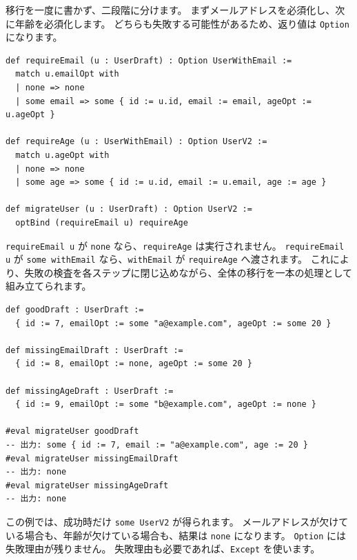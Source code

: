 移行を一度に書かず、二段階に分けます。
まずメールアドレスを必須化し、次に年齢を必須化します。
どちらも失敗する可能性があるため、返り値は \texttt{Option} になります。

\begin{listing}[htbp]
\begin{verbatim}
def requireEmail (u : UserDraft) : Option UserWithEmail :=
  match u.emailOpt with
  | none => none
  | some email => some { id := u.id, email := email, ageOpt := u.ageOpt }

def requireAge (u : UserWithEmail) : Option UserV2 :=
  match u.ageOpt with
  | none => none
  | some age => some { id := u.id, email := u.email, age := age }

def migrateUser (u : UserDraft) : Option UserV2 :=
  optBind (requireEmail u) requireAge
\end{verbatim}
\caption{\texttt{migrateUser}}
\label{lst:ch17_user_migration}
\end{listing}

\texttt{requireEmail u} が \texttt{none} なら、\texttt{requireAge} は実行されません。
\texttt{requireEmail u} が \texttt{some withEmail} なら、\texttt{withEmail} が \texttt{requireAge} へ渡されます。
これにより、失敗の検査を各ステップに閉じ込めながら、全体の移行を一本の処理として組み立てられます。

\begin{listing}[htbp]
\begin{verbatim}
def goodDraft : UserDraft :=
  { id := 7, emailOpt := some "a@example.com", ageOpt := some 20 }

def missingEmailDraft : UserDraft :=
  { id := 8, emailOpt := none, ageOpt := some 20 }

def missingAgeDraft : UserDraft :=
  { id := 9, emailOpt := some "b@example.com", ageOpt := none }

#eval migrateUser goodDraft
-- 出力: some { id := 7, email := "a@example.com", age := 20 }
#eval migrateUser missingEmailDraft
-- 出力: none
#eval migrateUser missingAgeDraft
-- 出力: none
\end{verbatim}
\caption{\texttt{migrateUser} の実行例}
\label{lst:ch17_user_examples}
\end{listing}

この例では、成功時だけ \texttt{some UserV2} が得られます。
メールアドレスが欠けている場合も、年齢が欠けている場合も、結果は \texttt{none} になります。
\texttt{Option} には失敗理由が残りません。
失敗理由も必要であれば、\texttt{Except} を使います。


